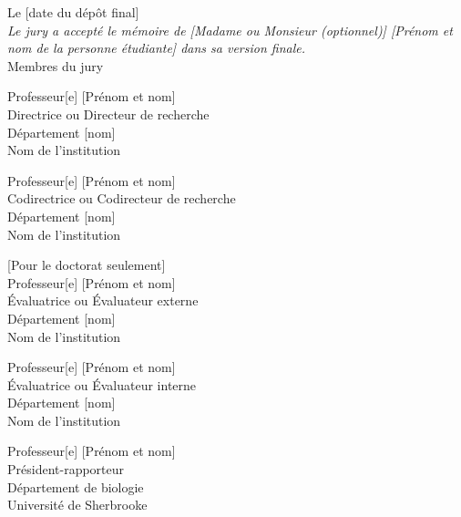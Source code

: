 \documentclass[12pt,oneside]{book}
\newcommand{\blankpage}{	%
\newpage
\thispagestyle{empty}
\mbox{}
\newpage
}
\begin{document}
\blankpage
\thispagestyle{empty}
\singlespacing
\begin{center}
Le [date du dépôt final]\\   \vspace{1cm} %
\textit{Le jury a accepté le mémoire de [Madame ou Monsieur (optionnel)] [Prénom et nom
de la personne étudiante] dans sa version finale.}\\  \vspace{1cm}
Membres du jury\\  \vspace{1cm}

Professeur[e] [Prénom et nom]\\
Directrice ou Directeur de recherche\\
Département [nom]\\
Nom de l'institution\\ \vspace{13mm}

Professeur[e] [Prénom et nom]\\
Codirectrice ou Codirecteur de recherche\\
Département [nom]\\
Nom de l'institution\\ \vspace{13mm}

[Pour le doctorat seulement]\\
Professeur[e] [Prénom et nom]\\
Évaluatrice ou Évaluateur externe\\
Département [nom]\\
Nom de l'institution\\ \vspace{13mm}

Professeur[e] [Prénom et nom]\\
Évaluatrice ou Évaluateur interne\\
Département [nom]\\
Nom de l'institution\\ \vspace{13mm}

Professeur[e] [Prénom et nom]\\
Président-rapporteur\\
Département de biologie\\
Université de Sherbrooke\\ \vspace{13mm}
\end{center}
\end{document}
